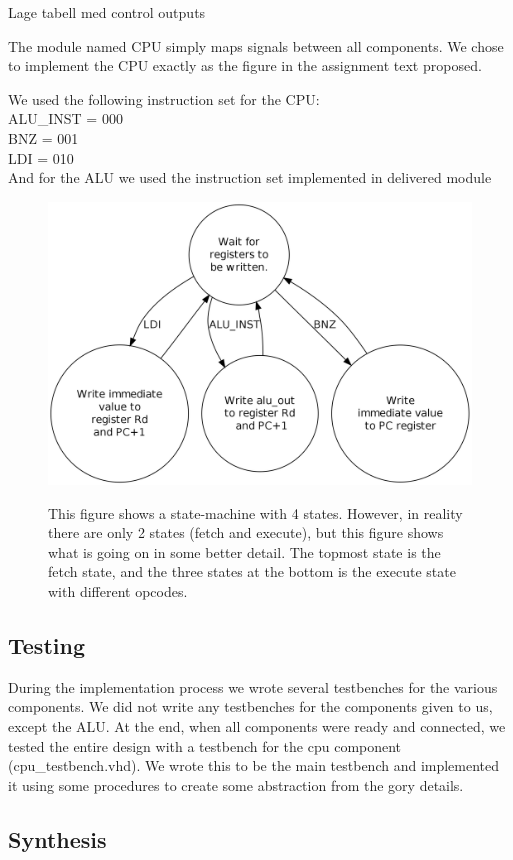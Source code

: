 \documentclass[10pt]{report}
\begin{document}
Lage tabell med control outputs

The module named CPU simply maps signals between all components.  
We chose to implement the CPU exactly as the figure in the assignment text proposed.

We used the following instruction set for the CPU:\\
ALU\_INST = 000\\
BNZ = 001\\
LDI = 010\\

And for the ALU we used the instruction set implemented in delivered module

\begin{figure}
\includegraphics[width=.75\linewidth]{state_diagram.png} \\
\caption{This figure shows a state-machine with 4 states. However, in reality there 
are only 2 states (fetch and execute), but this figure shows what is going on in some 
better detail. The topmost state is the fetch state, and the three states at the 
bottom is the execute state with different opcodes.}
\end{figure}

\subsection*{Testing}

During the implementation process we wrote several testbenches
for the various components. We did not write any testbenches for the
components given to us, except the ALU. At the end, when all components were ready and
connected, we tested the entire design with a testbench for the cpu
component (cpu\_testbench.vhd).  We wrote this to be the main
testbench and implemented it using some procedures to create some
abstraction from the gory details.

\subsection*{Synthesis}
\end{document}
